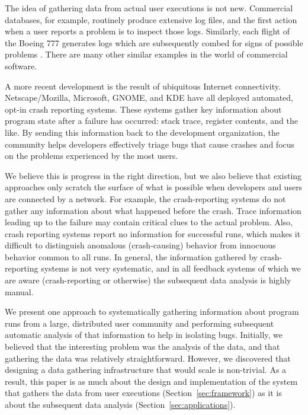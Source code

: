 The idea of gathering data from actual user executions is not new.
Commercial databases, for example, routinely produce extensive log
files, and the first action when a user reports a problem is to
inspect those logs.  Similarly, each flight of the Boeing 777
generates logs which are subsequently combed for signs of possible
problems \cite{Esler:2001:WVR}.  There are many other similar examples
in the world of commercial software.

A more recent development is the result of ubiquitous Internet
connectivity.  Netscape/Mozilla, Microsoft, GNOME, and KDE have all
deployed automated, opt-in crash reporting systems.  These systems
gather key information about program state after a failure has
occurred: stack trace, register contents, and the like.  By sending
this information back to the development organization, the community
helps developers effectively triage bugs that cause crashes and focus
on the problems experienced by the most users.

We believe this is progress in the right direction, but we also
believe that existing approaches only scratch the surface of what is
possible when developers and users are connected by a network.  For
example, the crash-reporting systems do not gather any information
about what happened before the crash.  Trace information leading up to
the failure may contain critical clues to the actual problem.  Also,
crash reporting systems report no information for successful runs,
which makes it difficult to distinguish anomalous (crash-causing)
behavior from innocuous behavior common to all runs.  In general, the
information gathered by crash-reporting systems is not very
systematic, and in all feedback systems of which we are aware
(crash-reporting or otherwise) the subsequent data analysis is highly
manual.

We present one approach to systematically gathering information about
program runs from a large, distributed user community and performing
subsequent automatic analysis of that information to help in isolating
bugs.  Initially, we believed that the interesting problem was the
analysis of the data, and that gathering the data was relatively
straightforward.  However, we discovered that designing a data
gathering infrastructure that would scale is non-trivial.  As a
result, this paper is as much about the design and implementation of
the system that gathers the data from user executions
(Section~\ref{sec:framework}) as it is about the subsequent data
analysis (Section~\ref{sec:applications}).

